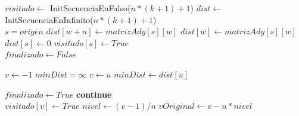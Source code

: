 
\begin{algorithm}[H]
\begin{algorithmic}
    
	\State $visitado \gets$ InitSecuenciaEnFalso($n*(k+1)+1$)    
	\State $dist \gets$ InitSecuenciaEnInfinito($n*(k+1)+1$)     \\

	\State $s = origen$    
	    
		    
			    
				    
					\State $dist[w+n] \gets matrizAdy[s][w]$    
				\EndIf
			\Else
				\State $dist[w] \gets matrizAdy[s][w]$    
			\EndIf
		\EndIf
	\EndFor \\

	\State $dist[s] \gets 0$    
	\State $visitado[s] \gets True$     \\

	\State $finalizado \gets False$    

	    
		\State $v \gets -1$    
		\State $minDist = \infty$    
		    
			    
				\State $v \gets u$    
				\State $minDist \gets dist[u]$    
			\EndIf
		\EndFor

		    
			\State $finalizado \gets True$    
			\State \textbf{continue} 
		\EndIf \\

		\State $visitado[v] \gets True$    
		\State $nivel \gets (v-1)/n$    
		\State $vOriginal \gets v - n * nivel$      \\


\end{algorithmic}
\end{algorithm}

